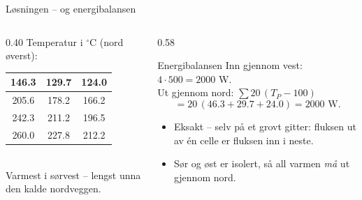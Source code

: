 \documentclass[11pt,aspectratio=169]{beamer}
\begin{document}
\begin{frame}{Løsningen -- og energibalansen}
\begin{columns}[c]
\begin{column}{0.40\textwidth}
\centering
Temperatur i $^\circ$C (nord øverst):\\[2mm]
\begin{tabular}{|c|c|c|}
\hline
146.3 & 129.7 & 124.0 \\ \hline
205.6 & 178.2 & 166.2 \\ \hline
242.3 & 211.2 & 196.5 \\ \hline
260.0 & 227.8 & 212.2 \\ \hline
\end{tabular}
\\[3mm]
\small Varmest i sørvest -- lengst unna den kalde nordveggen.
\end{column}
\begin{column}{0.58\textwidth}
\begin{oppsumb}{Energibalansen}
Inn gjennom vest: \quad $4\cdot 500 = 2000$ W.\\[1mm]
Ut gjennom nord: \quad $\displaystyle\sum 20\,(T_P - 100)$
\[
= 20\,(46.3 + 29.7 + 24.0) = 2000 \text{ W}.
\]
\end{oppsumb}
\begin{itemize}
\item Eksakt -- selv på et grovt gitter: fluksen ut av én celle er fluksen inn i neste.
\item Sør og øst er isolert, så all varmen \emph{må} ut gjennom nord.
\end{itemize}
\end{column}
\end{columns}
\end{frame}
\end{document}
